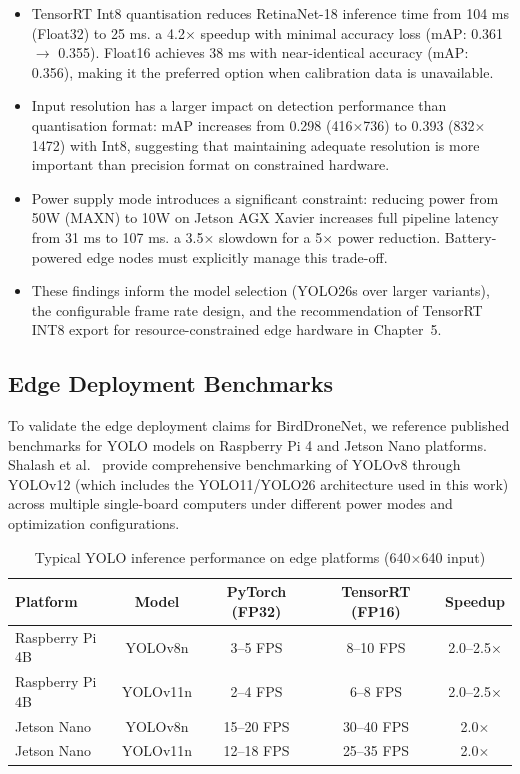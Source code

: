 \documentclass[12pt,a4paper]{report}
\renewcommand{\arraystretch}{1.1}
\begin{document}
\begin{itemize}
  \item TensorRT Int8 quantisation reduces RetinaNet-18 inference time from 104 ms (Float32)
        to 25 ms. a 4.2$\times$ speedup with minimal accuracy loss (mAP: 0.361 $\to$ 0.355).
        Float16 achieves 38 ms with near-identical accuracy (mAP: 0.356), making it the preferred
        option when calibration data is unavailable.
  \item Input resolution has a larger impact on detection performance than quantisation format:
        mAP increases from 0.298 (416$\times$736) to 0.393 (832$\times$1472) with Int8, suggesting
        that maintaining adequate resolution is more important than precision format on constrained hardware.
  \item Power supply mode introduces a significant constraint: reducing power from 50W (MAXN) to 10W
        on Jetson AGX Xavier increases full pipeline latency from 31 ms to 107 ms. a 3.5$\times$
        slowdown for a 5$\times$ power reduction. Battery-powered edge nodes must explicitly manage
        this trade-off.
  \item These findings inform the model selection (YOLO26s over larger variants), the configurable
        frame rate design, and the recommendation of TensorRT INT8 export for resource-constrained
        edge hardware in Chapter~5.
\end{itemize}

\subsection{Edge Deployment Benchmarks}

To validate the edge deployment claims for BirdDroneNet, we reference published
benchmarks for YOLO models on Raspberry Pi 4 and Jetson Nano platforms. Shalash
et al.~\cite{shalash2026yolo} provide comprehensive benchmarking of YOLOv8 through
YOLOv12 (which includes the YOLO11/YOLO26 architecture used in this work) across
multiple single-board computers under different power modes and optimization
configurations.

\begin{table}[H]
\centering
\caption[Edge platform inference benchmarks]{Typical YOLO inference performance on edge platforms (640$\times$640 input)}
\label{tab:edge_benchmarks}
\renewcommand{\arraystretch}{1.0}
\begin{tabular}{|l|c|c|c|c|}
\hline
\rowcolor{gray!20}
\textbf{Platform} & \textbf{Model} & \textbf{PyTorch (FP32)} & \textbf{TensorRT (FP16)} & \textbf{Speedup} \\
\hline
Raspberry Pi 4B & YOLOv8n & 3--5 FPS & 8--10 FPS & 2.0--2.5$\times$ \\
\hline
Raspberry Pi 4B & YOLOv11n & 2--4 FPS & 6--8 FPS & 2.0--2.5$\times$ \\
\hline
Jetson Nano & YOLOv8n & 15--20 FPS & 30--40 FPS & 2.0$\times$ \\
\hline
Jetson Nano & YOLOv11n & 12--18 FPS & 25--35 FPS & 2.0$\times$ \\
\hline
\end{tabular}
\end{table}
\end{document}

